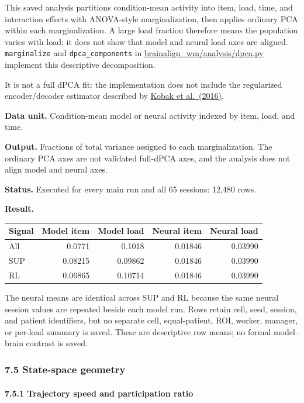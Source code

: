 \documentclass[
  10pt,
]{article}
\begin{document}
This saved analysis partitions condition-mean activity into item, load,
time, and interaction effects with ANOVA-style marginalization, then
applies ordinary PCA within each marginalization. A large load fraction
therefore means the population varies with load; it does not show that
model and neural load axes are aligned. \texttt{marginalize} and
\texttt{dpca\_components} in \url{brainalign_wm/analysis/dpca.py}
implement this descriptive decomposition.

It is not a full dPCA fit: the implementation does not include the
regularized encoder/decoder estimator described by
\href{https://doi.org/10.7554/eLife.10989}{Kobak et al.~(2016)}.

\textbf{Data unit.} Condition-mean model or neural activity indexed by
item, load, and time.

\textbf{Output.} Fractions of total variance assigned to each
marginalization. The ordinary PCA axes are not validated full-dPCA axes,
and the analysis does not align model and neural axes.

\textbf{Status.} Executed for every main run and all 65 sessions: 12,480
rows.

\textbf{Result.}

\begin{longtable}[]{@{}lrrrr@{}}
\toprule\noalign{}
Signal & Model item & Model load & Neural item & Neural load \\
\midrule\noalign{}
\endhead
\bottomrule\noalign{}
\endlastfoot
All & 0.0771 & 0.1018 & 0.01846 & 0.03990 \\
SUP & 0.08215 & 0.09862 & 0.01846 & 0.03990 \\
RL & 0.06865 & 0.10714 & 0.01846 & 0.03990 \\
\end{longtable}

The neural means are identical across SUP and RL because the same neural
session values are repeated beside each model run. Rows retain cell,
seed, session, and patient identifiers, but no separate cell,
equal-patient, ROI, worker, manager, or per-load summary is saved. These
are descriptive row means; no formal model--brain contrast is saved.

\hypertarget{state-space-geometry}{%
\subsubsection{7.5 State-space geometry}\label{state-space-geometry}}

\hypertarget{trajectory-speed-and-participation-ratio}{%
\paragraph{7.5.1 Trajectory speed and participation
ratio}\label{trajectory-speed-and-participation-ratio}}
\end{document}
